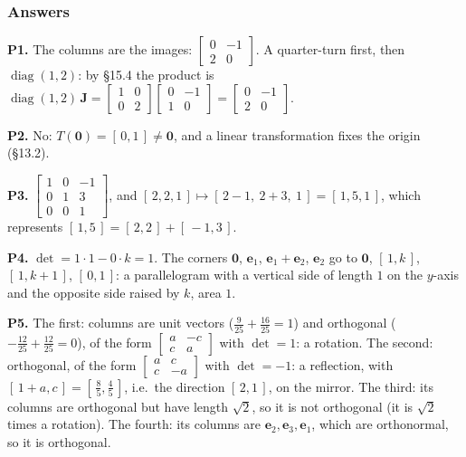 \documentclass[11pt]{article}
\theoremstyle{plain}
\theoremstyle{definition}
\theoremstyle{remark}
\newcommand{\vc}[1]{\mathbf{#1}}
\newcommand{\mt}[1]{\mathbf{#1}}
\DeclareMathOperator{\diagop}{diag}
\begin{document}
\subsubsection*{Answers}

\noindent\textbf{P1.} The columns are the images:
$\begin{bmatrix}0&-1\\2&0\end{bmatrix}$. A quarter-turn first, then
$\diagop(1,2)$: by \S15.4 the product is
$\diagop(1,2)\,\mt{J}=\begin{bmatrix}1&0\\0&2\end{bmatrix}\begin{bmatrix}0&-1\\1&0\end{bmatrix}
=\begin{bmatrix}0&-1\\2&0\end{bmatrix}$. \checkmark

\smallskip
\noindent\textbf{P2.} No: $T(\vc{0})=[\,0,1\,]\neq\vc{0}$, and a linear
transformation fixes the origin (\S13.2).

\smallskip
\noindent\textbf{P3.} $\begin{bmatrix}1&0&-1\\0&1&3\\0&0&1\end{bmatrix}$, and
$[\,2,2,1\,]\mapsto[\,2-1,\ 2+3,\ 1\,]=[\,1,5,1\,]$, which represents
$[\,1,5\,]=[\,2,2\,]+[\,-1,3\,]$. \checkmark

\smallskip
\noindent\textbf{P4.} $\det=1\cdot1-0\cdot k=1$. The corners $\vc{0}$,
$\vc{e}_1$, $\vc{e}_1+\vc{e}_2$, $\vc{e}_2$ go to $\vc{0}$, $[\,1,k\,]$,
$[\,1,k+1\,]$, $[\,0,1\,]$: a parallelogram with a vertical side of length
$1$ on the $y$-axis and the opposite side raised by $k$, area $1$.

\smallskip
\noindent\textbf{P5.} The first: columns are unit vectors
($\tfrac{9}{25}+\tfrac{16}{25}=1$) and orthogonal
($-\tfrac{12}{25}+\tfrac{12}{25}=0$), of the form
$\begin{bmatrix}a&-c\\c&a\end{bmatrix}$ with $\det=1$: a rotation. The second:
orthogonal, of the form $\begin{bmatrix}a&c\\c&-a\end{bmatrix}$ with
$\det=-1$: a reflection, with $[\,1+a,c\,]=[\,\tfrac85,\tfrac45\,]$, i.e.\ the
direction $[\,2,1\,]$, on the mirror. The third: its columns are orthogonal
but have length $\sqrt2$, so it is not orthogonal (it is $\sqrt2$ times a
rotation). The fourth: its columns are $\vc{e}_2,\vc{e}_3,\vc{e}_1$, which are
orthonormal, so it is orthogonal.
\end{document}
